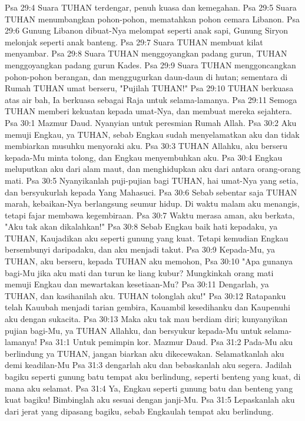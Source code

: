 Psa 29:4  Suara TUHAN terdengar, penuh kuasa dan kemegahan.
Psa 29:5  Suara TUHAN menumbangkan pohon-pohon, mematahkan pohon cemara Libanon.
Psa 29:6  Gunung Libanon dibuat-Nya melompat seperti anak sapi, Gunung Siryon melonjak seperti anak banteng.
Psa 29:7  Suara TUHAN membuat kilat menyambar.
Psa 29:8  Suara TUHAN menggoyangkan padang gurun, TUHAN menggoyangkan padang gurun Kades.
Psa 29:9  Suara TUHAN menggoncangkan pohon-pohon berangan, dan menggugurkan daun-daun di hutan; sementara di Rumah TUHAN umat berseru, "Pujilah TUHAN!"
Psa 29:10  TUHAN berkuasa atas air bah, Ia berkuasa sebagai Raja untuk selama-lamanya.
Psa 29:11  Semoga TUHAN memberi kekuatan kepada umat-Nya, dan membuat mereka sejahtera.
Psa 30:1  Mazmur Daud. Nyanyian untuk peresmian Rumah Allah.
Psa 30:2  Aku memuji Engkau, ya TUHAN, sebab Engkau sudah menyelamatkan aku dan tidak membiarkan musuhku menyoraki aku.
Psa 30:3  TUHAN Allahku, aku berseru kepada-Mu minta tolong, dan Engkau menyembuhkan aku.
Psa 30:4  Engkau meluputkan aku dari alam maut, dan menghidupkan aku dari antara orang-orang mati.
Psa 30:5  Nyanyikanlah puji-pujian bagi TUHAN, hai umat-Nya yang setia, dan bersyukurlah kepada Yang Mahasuci.
Psa 30:6  Sebab sebentar saja TUHAN marah, kebaikan-Nya berlangsung seumur hidup. Di waktu malam aku menangis, tetapi fajar membawa kegembiraan.
Psa 30:7  Waktu merasa aman, aku berkata, "Aku tak akan dikalahkan!"
Psa 30:8  Sebab Engkau baik hati kepadaku, ya TUHAN, Kaujadikan aku seperti gunung yang kuat. Tetapi kemudian Engkau bersembunyi daripadaku, dan aku menjadi takut.
Psa 30:9  Kepada-Mu, ya TUHAN, aku berseru, kepada TUHAN aku memohon,
Psa 30:10  "Apa gunanya bagi-Mu jika aku mati dan turun ke liang kubur? Mungkinkah orang mati memuji Engkau dan mewartakan kesetiaan-Mu?
Psa 30:11  Dengarlah, ya TUHAN, dan kasihanilah aku. TUHAN tolonglah aku!"
Psa 30:12  Ratapanku telah Kauubah menjadi tarian gembira, Kauambil kesedihanku dan Kaupenuhi aku dengan sukacita.
Psa 30:13  Maka aku tak mau berdiam diri; kunyanyikan pujian bagi-Mu, ya TUHAN Allahku, dan bersyukur kepada-Mu untuk selama-lamanya!
Psa 31:1  Untuk pemimpin kor. Mazmur Daud.
Psa 31:2  Pada-Mu aku berlindung ya TUHAN, jangan biarkan aku dikecewakan. Selamatkanlah aku demi keadilan-Mu
Psa 31:3  dengarlah aku dan bebaskanlah aku segera. Jadilah bagiku seperti gunung batu tempat aku berlindung, seperti benteng yang kuat, di mana aku selamat.
Psa 31:4  Ya, Engkau seperti gunung batu dan benteng yang kuat bagiku! Bimbinglah aku sesuai dengan janji-Mu.
Psa 31:5  Lepaskanlah aku dari jerat yang dipasang bagiku, sebab Engkaulah tempat aku berlindung.
